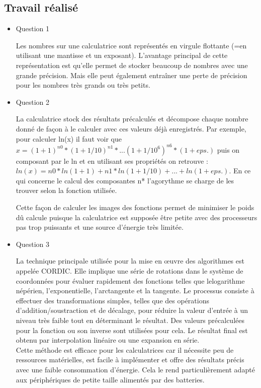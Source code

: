 \documentclass{article}
\begin{document}
\subsection{Travail réalisé}


\begin{itemize}
\item{Question 1}

Les nombres sur une calculatrice sont représentés en virgule flottante (=en utilisant une mantisse et un exposant). L'avantage principal de cette représentation est qu'elle permet de stocker beaucoup de nombres avec une grande précision. Mais elle peut également entraîner une perte de précision pour les nombres très grands ou très petits.
\item{Question 2}

La calculatrice stock des résultats précalculés et décompose chaque nombre donné de façon à le calculer avec ces valeurs déjà enregistrés. Par exemple, pour calculer ln(x) il faut voir que $x= (1+1)^{n0}*(1+1/10)^{n1}*...(1+1/10^6)^{n6}*(1+eps.)$ puis on composant par le ln et en utilisant ses propriétés on retrouve : $ln(x)= n0*ln(1+1)+n1*ln(1+1/10)+... +ln(1+eps.)$. En ce qui concerne le calcul des composantes n* l'agorythme se charge de les trouver selon la fonction utilisée.

Cette façon de calculer les images des fonctions permet de minimiser le poids dû calcule puisque la calculatrice est supposée être petite avec des processeurs pas trop puissants et une source d'énergie très limitée.
\item{Question 3}

La technique principale utilisée pour la mise en œuvre des algorithmes est appelée CORDIC. Elle implique une série de rotations dans le système de coordonnées pour évaluer rapidement des fonctions telles que lelogarithme népérien, l'exponentielle, l'arctangente et la tangente. Le processus consiste à effectuer des transformations simples, telles que des opérations d'addition/soustraction et de décalage, pour réduire la valeur d'entrée à un niveau très faible tout en déterminant le résultat. Des valeurs précalculées pour la fonction ou son inverse sont utilisées pour cela. Le résultat final est obtenu par interpolation linéaire ou une expansion en série.\\
Cette méthode est efficace pour les calculatrices car il nécessite peu de ressources matérielles, est facile à implémenter et offre des résultats précis avec une faible consommation d'énergie. Cela le rend particulièrement adapté aux périphériques de petite taille alimentés par des batteries.
\\



\end{itemize}
\end{document}
